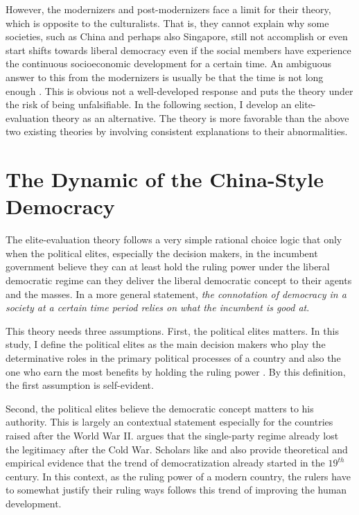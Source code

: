 \documentclass[abstracton,UTF8]{ctexart}
\begin{document}
However, the modernizers and post-modernizers face a limit for their theory, which is opposite to the culturalists. That is, they cannot explain why some societies, such as China and perhaps also Singapore, still not accomplish or even start shifts towards liberal democracy even if the social members have experience the continuous socioeconomic development for a certain time. An ambiguous answer to this from the modernizers is usually be that the time is not long enough \citep{Inglehart2005}. This is obvious not a well-developed response and puts the theory under the risk of being unfalsifiable. In the following section, I develop an elite-evaluation theory as an alternative. The theory is more favorable than the above two existing theories by involving consistent explanations to their abnormalities.

\section{The Dynamic of the China-Style Democracy}\label{s:theory}
The elite-evaluation theory follows a very simple rational choice logic that only when the political elites, especially the decision makers, in the incumbent government believe they can at least hold the ruling power under the liberal democratic regime can they deliver the liberal democratic concept to their agents and the masses. In a more general statement, \textit{the connotation of democracy in a society at a certain time period relies on what the incumbent is good at}. 

This theory needs three assumptions. First, the political elites matters. In this study, I define the political elites as the main decision makers who play the determinative roles in the primary political processes of a country and also the one who earn the most benefits by holding the ruling power \citep{BuenodeM2003}. By this definition, the first assumption is self-evident. 

Second, the political elites believe the democratic concept matters to his authority. This is largely an contextual statement especially for the countries raised after the World War II. \citet{Schedler2013} argues that the single-party regime already lost the legitimacy after the Cold War. Scholars like \citet{Fukuyama2006} and \citet{Huntington1993} also provide theoretical and empirical evidence that the trend of democratization already started in the $19^{th}$ century. In this context, as the ruling power of a modern country, the rulers have to somewhat justify their ruling ways follows this trend of improving the human development. 
\end{document}
